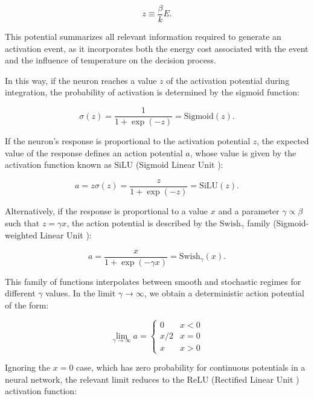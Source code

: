 \documentclass[12pt]{article}
\begin{document}
\begin{equation}
z \equiv \frac{\beta}{k} E.
\end{equation}

This potential summarizes all relevant information required to generate an activation event, as it incorporates both the energy cost associated with the event and the influence of temperature on the decision process. 

In this way, if the neuron reaches a value $z$ of the activation potential during integration, the probability of activation is determined by the sigmoid function:

\begin{equation}
\sigma(z) = \frac{1}{1+\exp(-z)} = \text{Sigmoid}(z).
\end{equation}

If the neuron’s response is proportional to the activation potential $z$, the expected value of the response defines an action potential $a$, whose value is given by the activation function known as $\text{SiLU}$ (Sigmoid Linear Unit  \cite{elfwing2018sigmoid}):

\begin{equation}
a = z \sigma(z) = \frac{z}{1+\exp(-z)} = \text{SiLU}(z).
\end{equation}

Alternatively, if the response is proportional to a value $x$ and a parameter $\gamma \propto \beta$ such that $z = \gamma x$, the action potential is described by the $\text{Swish}_{\gamma}$ family (Sigmoid-weighted Linear Unit \cite{ramachandran2017swish}):

\begin{equation}
a = \frac{x}{1+\exp(-\gamma x)} = \text{Swish}_{\gamma}(x).
\end{equation}

This family of functions interpolates between smooth and stochastic regimes for different $\gamma$ values. In the limit $\gamma \rightarrow \infty$, we obtain a deterministic action potential of the form:

\begin{equation}
\lim_{\gamma \rightarrow \infty} a =  
\begin{cases}  
0 & x < 0 \\  
x/2 & x = 0 \\  
x & x > 0  
\end{cases}
\end{equation}

Ignoring the $x = 0$ case, which has zero probability for continuous potentials in a neural network, the relevant limit reduces to the $\text{ReLU}$ (Rectified Linear Unit \cite{nair2010relu}) activation function:
\end{document}
